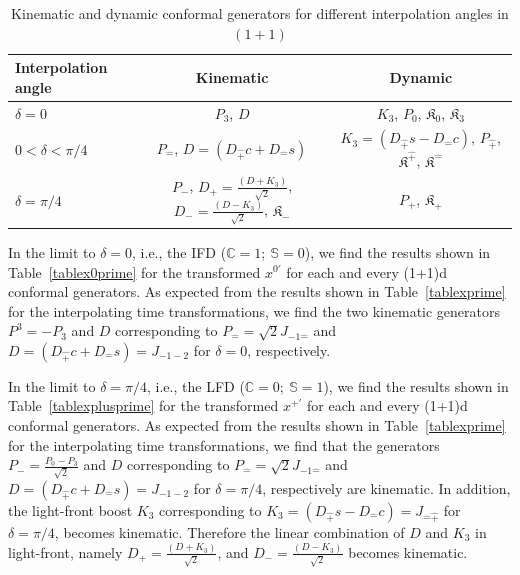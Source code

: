\documentclass[%
 reprint,
superscriptaddress,
 amsmath,amssymb,
 aps,
]{revtex4-2}
\newcommand{\pT}{\hat{+}}
\newcommand{\mT}{\hat{-}}
\begin{document}
\begin{widetext}
\begin{table}[h!]
    \begin{ruledtabular}
       \begin{tabular}{lcc}
	Interpolation angle & Kinematic & Dynamic \\
	\hline
	\rule{0pt}{3ex} $\delta=0$ & $P_{3}$, $D$ & $ K_{3}$, $P_{0}$, $\mathfrak{K}_{{0}}$, $\mathfrak{K}_{{3}}$\\
	$0<\delta<\pi/4$ &  $P_{\mT}$, $D=\left(D_{\hat{+}}c+D_{\hat{-}}s\right)$ &  $K_3=\left(D_{\hat{+}}s-D_{\hat{-}}c\right)$,  $P_{\pT}$, $\mathfrak{K}^{\hat{+}}$, $\mathfrak{K}^{\hat{-}}$\\
	$\delta=\pi/4$ & $P_{-}$, $D_{+}=\frac{(D+K_3)}{\sqrt{2}} $, $D_{-}=\frac{(D-K_3)}{\sqrt{2}}$, $\mathfrak{K}_{{-}}$& $P_{+}$, $\mathfrak{K}_{{+}}$\\
      \end{tabular}
    \end{ruledtabular}
    \caption{\label{tab:Kinematic_and_dynamic_generators_for_different_interoplation_angles_conformal1+1}Kinematic and dynamic conformal generators for different interpolation angles in $(1+1)$}
\end{table}
\end{widetext}
%


In the limit to $\delta=0$, i.e., the IFD ($\mathbb{C}=1;~\mathbb{S}=0$), we find the results shown in Table~\ref{tablex0prime} for the transformed $x^{0\prime}$ 
for each and every (1+1)d conformal generators. As expected from the results shown in Table~\ref{tablexprime} for the interpolating time transformations, we find the two kinematic generators $P^3 = - P_3$ and $D$ corresponding 
to $P_{\hat -} = \sqrt{2}J_{-1\hat{-}}$ and $D=\left(D_{\hat{+}}c+D_{\hat{-}}s\right)=J_{-1 -2}$ for $\delta =0$, respectively.

In the limit to $\delta=\pi/4$, i.e., the LFD ($\mathbb{C}=0;~\mathbb{S}=1$), we find the results shown in Table~\ref{tablexplusprime} for the transformed $x^{+\prime}$ for each and every (1+1)d conformal generators. As expected from the results shown in Table~\ref{tablexprime} for the interpolating time transformations, we find that the generators $P_{-} = \frac{P_{0}-P_{3}}{\sqrt{2}}$ and $D$ corresponding to $P_{\hat -} = \sqrt{2}J_{-1\hat{-}}$ and $D=\left(D_{\hat{+}}c+D_{\hat{-}}s\right)=J_{-1 -2}$ for $\delta =\pi/4$, respectively are kinematic. In addition, the light-front boost $K_3$ corresponding to $K_3=\left(D_{\hat{+}}s-D_{\hat{-}}c\right)=J_{\hat{-}\hat{+}}$ for $\delta =\pi/4$,  becomes kinematic. Therefore the linear combination of $D$ and $K_3$ in light-front, namely  $D_{+}=\frac{(D+K_3)}{\sqrt{2}} $, and $D_{-}=\frac{(D-K_3)}{\sqrt{2}}$ becomes kinematic. 
\end{document}
